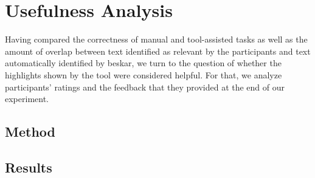 
\clearpage

\section{Usefulness Analysis}
\label{cp6:usefulness}


Having compared the correctness of manual and tool-assisted tasks as well 
as the amount of overlap between text identified as relevant by the participants and 
text automatically identified by \acs{beskar}, we turn to the question of 
whether the highlights shown by the tool were considered helpful. 
For that, we analyze participants' ratings and the feedback that they 
provided at the end of our experiment.



\subsection{Method}








\subsection{Results}







